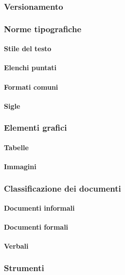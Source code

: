 	\subsubsection{Versionamento}
	\subsubsection{Norme tipografiche}
		\paragraph{Stile del testo}
		\paragraph{Elenchi puntati}
		\paragraph{Formati comuni}
		\paragraph{Sigle}
	\subsubsection{Elementi grafici}
		\paragraph{Tabelle}
		\paragraph{Immagini}
	\subsubsection{Classificazione dei documenti}
		\paragraph{Documenti informali}
		\paragraph{Documenti formali}
		\paragraph{Verbali}
	\subsubsection{Strumenti}
